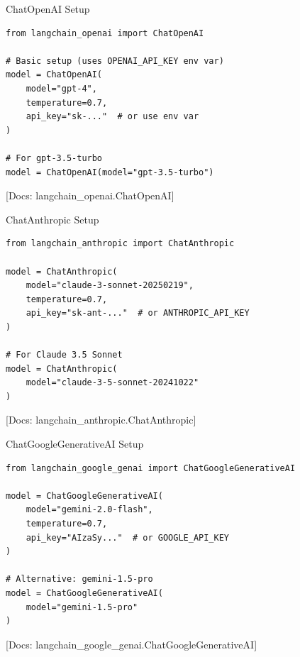 \documentclass[aspectratio=169,11pt]{beamer}
\newcommand{\docref}[1]{{\scriptsize\color{docgray}[Docs: #1]}}
\begin{document}
\begin{frame}[fragile]{ChatOpenAI Setup}
  \begin{codebox}
    \begin{lstlisting}
from langchain_openai import ChatOpenAI

# Basic setup (uses OPENAI_API_KEY env var)
model = ChatOpenAI(
    model="gpt-4",
    temperature=0.7,
    api_key="sk-..."  # or use env var
)

# For gpt-3.5-turbo
model = ChatOpenAI(model="gpt-3.5-turbo")
    \end{lstlisting}
  \end{codebox}

  \docref{langchain\_openai.ChatOpenAI}
\end{frame}

\begin{frame}[fragile]{ChatAnthropic Setup}
  \begin{codebox}
    \begin{lstlisting}
from langchain_anthropic import ChatAnthropic

model = ChatAnthropic(
    model="claude-3-sonnet-20250219",
    temperature=0.7,
    api_key="sk-ant-..."  # or ANTHROPIC_API_KEY
)

# For Claude 3.5 Sonnet
model = ChatAnthropic(
    model="claude-3-5-sonnet-20241022"
)
    \end{lstlisting}
  \end{codebox}

  \docref{langchain\_anthropic.ChatAnthropic}
\end{frame}

\begin{frame}[fragile]{ChatGoogleGenerativeAI Setup}
  \begin{codebox}
    \begin{lstlisting}
from langchain_google_genai import ChatGoogleGenerativeAI

model = ChatGoogleGenerativeAI(
    model="gemini-2.0-flash",
    temperature=0.7,
    api_key="AIzaSy..."  # or GOOGLE_API_KEY
)

# Alternative: gemini-1.5-pro
model = ChatGoogleGenerativeAI(
    model="gemini-1.5-pro"
)
    \end{lstlisting}
  \end{codebox}

  \docref{langchain\_google\_genai.ChatGoogleGenerativeAI}
\end{frame}
\end{document}

